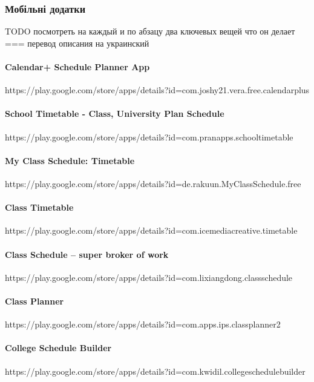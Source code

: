 \subsubsection{Мобільні додатки}

TODO посмотреть на каждый и по абзацу два ключевых вещей что он делает === перевод описания на украинский


\paragraph{Calendar+ Schedule Planner App}

https://play.google.com/store/apps/details?id=com.joshy21.vera.free.calendarplus

\paragraph{School Timetable - Class, University Plan Schedule}

https://play.google.com/store/apps/details?id=com.pranapps.schooltimetable

\paragraph{My Class Schedule: Timetable}

https://play.google.com/store/apps/details?id=de.rakuun.MyClassSchedule.free

\paragraph{Class Timetable}

https://play.google.com/store/apps/details?id=com.icemediacreative.timetable

\paragraph{Class Schedule – super broker of work}

https://play.google.com/store/apps/details?id=com.lixiangdong.classschedule

\paragraph{Class Planner}

https://play.google.com/store/apps/details?id=com.apps.ips.classplanner2

\paragraph{College Schedule Builder}

https://play.google.com/store/apps/details?id=com.kwidil.collegeschedulebuilder

